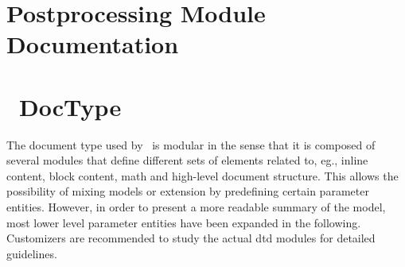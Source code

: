 \documentclass{report}
\begin{document}
\chapter[Postprocessing Modules]{Postprocessing Module Documentation}\label{postmodules}


\chapter[DocType]{\LaTeXML\ DocType}\label{dtd}
The document type used by \LaTeXML\ is modular in the sense
that it is composed of several modules that define different
sets of elements related to, eg., inline content, block content,
math and high-level document structure.  This allows the possibility
of mixing models or extension by predefining certain parameter entities.
However, in order to present a more readable summary of the model,
most lower level parameter entities have been expanded in the following.
Customizers are recommended to study the actual dtd modules for
detailed guidelines.


\end{document}
